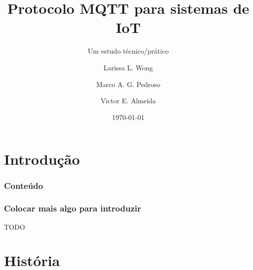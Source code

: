 \documentclass[12pt]{beamer}
\author[Grupo: MQTT]{Larissa L. Wong \and Marco A. G. Pedroso \and Victor E. Almeida}
\title{Protocolo MQTT para sistemas de IoT}
\subtitle{Um estudo técnico/prático}
\date{\today}
\institute{UNIOESTE}
\begin{document}
\frame{\titlepage}

\section{Introdução}\label{Introdução}

\begin{frame}
\frametitle{Conteúdo}
\tableofcontents
\end{frame}

\begin{frame}
    \frametitle{Colocar mais algo para introduzir}
    TODO
\end{frame}

\section{História}\label{História}
\end{document}
